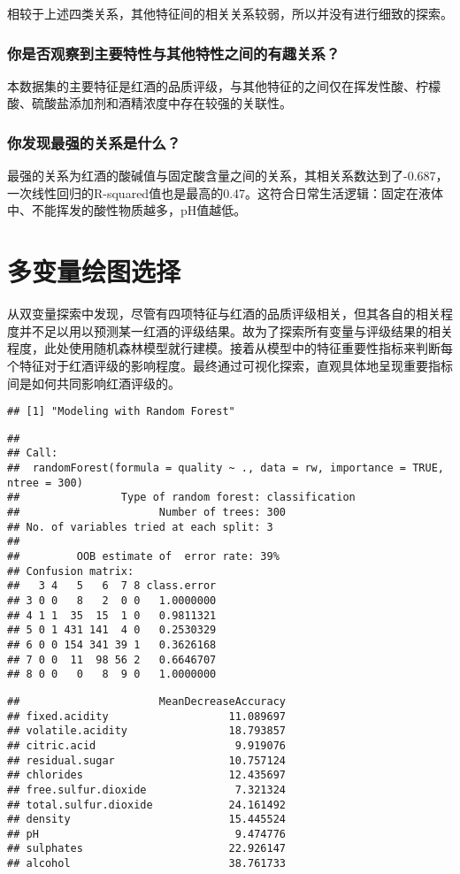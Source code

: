 \documentclass[]{article}
\begin{document}
相较于上述四类关系，其他特征间的相关关系较弱，所以并没有进行细致的探索。

\subsubsection{你是否观察到主要特性与其他特性之间的有趣关系？}

本数据集的主要特征是红酒的品质评级，与其他特征的之间仅在挥发性酸、柠檬酸、硫酸盐添加剂和酒精浓度中存在较强的关联性。

\subsubsection{你发现最强的关系是什么？}

最强的关系为红酒的酸碱值与固定酸含量之间的关系，其相关系数达到了-0.687，一次线性回归的R-squared值也是最高的0.47。这符合日常生活逻辑：固定在液体中、不能挥发的酸性物质越多，pH值越低。

\section{多变量绘图选择}

从双变量探索中发现，尽管有四项特征与红酒的品质评级相关，但其各自的相关程度并不足以用以预测某一红酒的评级结果。故为了探索所有变量与评级结果的相关程度，此处使用随机森林模型就行建模。接着从模型中的特征重要性指标来判断每个特征对于红酒评级的影响程度。最终通过可视化探索，直观具体地呈现重要指标间是如何共同影响红酒评级的。

\begin{verbatim}
## [1] "Modeling with Random Forest"
\end{verbatim}

\begin{verbatim}
## 
## Call:
##  randomForest(formula = quality ~ ., data = rw, importance = TRUE,      ntree = 300) 
##                Type of random forest: classification
##                      Number of trees: 300
## No. of variables tried at each split: 3
## 
##         OOB estimate of  error rate: 39%
## Confusion matrix:
##   3 4   5   6  7 8 class.error
## 3 0 0   8   2  0 0   1.0000000
## 4 1 1  35  15  1 0   0.9811321
## 5 0 1 431 141  4 0   0.2530329
## 6 0 0 154 341 39 1   0.3626168
## 7 0 0  11  98 56 2   0.6646707
## 8 0 0   0   8  9 0   1.0000000
\end{verbatim}

\begin{verbatim}
##                      MeanDecreaseAccuracy
## fixed.acidity                   11.089697
## volatile.acidity                18.793857
## citric.acid                      9.919076
## residual.sugar                  10.757124
## chlorides                       12.435697
## free.sulfur.dioxide              7.321324
## total.sulfur.dioxide            24.161492
## density                         15.445524
## pH                               9.474776
## sulphates                       22.926147
## alcohol                         38.761733
\end{verbatim}
\end{document}
